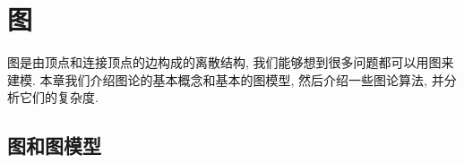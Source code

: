 \documentclass[10pt,UTF8]{book} %
\begin{document}




    



\newpage
\thispagestyle{empty}

\chapter{图}

图是由顶点和连接顶点的边构成的离散结构, 我们能够想到很多问题都可以用图来建模.
本章我们介绍图论的基本概念和基本的图模型, 然后介绍一些图论算法, 并分析它们的复杂度.

\section{图和图模型}
\end{document}
